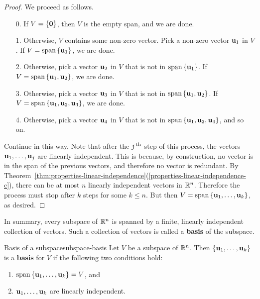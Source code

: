 \begin{proof}
  We proceed as follows.
  \begin{enumerate}
  \item[0.] If $V=\left\{\mbox{\bf 0}\right\}$, then $V$ is the empty span, and we
    are done.
  \item[1.] Otherwise, $V$ contains some non-zero vector.  Pick a
    non-zero vector $\mbox{\bf u}_{1}$ in $V$. If
    $V=\sspan\set{\vect{u}_{1}}$, we are done.
  \item[2.] Otherwise, pick a vector $\mbox{\bf u}_{2}$ in $V$ that is not
    in $\sspan\set{\vect{u}_{1}}$. If
    $V=\sspan\set{\vect{u}_{1},\vect{u}_{2}}$, we are done.
  \item[3.] Otherwise, pick a vector $\mbox{\bf u}_{3}$ in $V$ that is not
    in $\sspan\set{\vect{u}_{1},\vect{u}_{2}}$. If
    $V=\sspan\set{\vect{u}_{1},\vect{u}_{2},\vect{u}_{3}}$, we are done.
  \item[4.] Otherwise, pick a vector $\mbox{\bf u}_{4}$ in $V$ that is not
    in $\sspan\set{\vect{u}_{1},\vect{u}_{2},\vect{u}_{4}}$, and so on.
  \end{enumerate}
  Continue in this way. Note that after the $j^{\,\rm th}$ step of this
  process, the vectors $\mbox{\bf u}_1,\ldots,\mbox{\bf u}_j$ are linearly
  independent. This is because, by construction, no vector is in the
  span of the previous vectors, and therefore no vector is redundant.
  By
  Theorem~\ref{thm:properties-linear-independence}(\ref{properties-linear-independence-c}),
  there can be at most $n$ linearly independent vectors in $\mathbb{R}^n$.
  Therefore the process must stop after $k$ steps for some $k\leq
  n$. But then $V=\sspan\set{\vect{u}_{1},\ldots ,\vect{u}_{k}}$, as
  desired.
\end{proof}

In summary, every subspace of\/ $\mathbb{R}^{n}$ is spanned by a finite,
linearly independent collection of vectors.  Such a collection of
vectors is called a \textbf{basis} of the subspace.

\begin{definition}{Basis of a subspace}{subspace-basis}
  Let $V$ be a subspace of\/ $\mathbb{R}^{n}$. Then
  $\left\{\mbox{\bf u}_{1},\ldots ,\mbox{\bf u}_{k}\right\}$ is a \textbf{basis} for
  $V$ if the following two conditions hold:%
  \begin{enumerate}
  \item $\sspan\set{\vect{u}_{1},\ldots,\vect{u}_{k}}=V$, and
  \item $\mbox{\bf u}_{1},\ldots,\mbox{\bf u}_{k}$ are linearly independent.
  \end{enumerate}
\end{definition}

